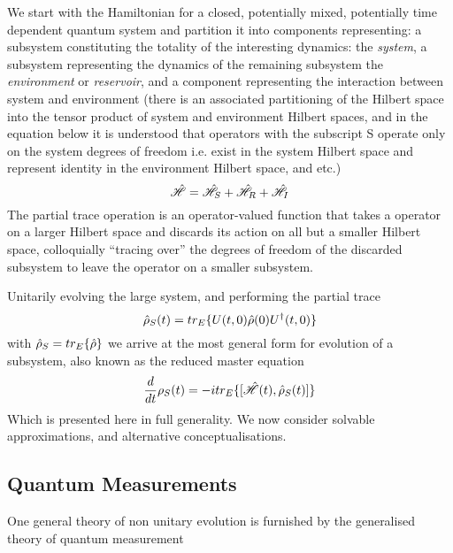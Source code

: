 We start with the Hamiltonian for a closed, potentially mixed, potentially time dependent quantum system and partition it into components representing: a subsystem constituting the totality of the interesting dynamics: the \emph{system}, a subsystem representing the dynamics of the remaining subsystem the \emph{environment} or \emph{reservoir}, and a component representing the interaction between system and environment (there is an associated partitioning of the Hilbert space into the tensor product of system and environment Hilbert spaces, and in the equation below it is understood that operators with the subscript S operate only on the system degrees of freedom i.e. exist in the system Hilbert space and represent identity in the environment Hilbert space, and etc.)
\begin{equation}
	\hat{\mathscr{H}} = \hat{\mathscr{H}}_S +\hat{\mathscr{H}}_R + \hat{\mathscr{H}}_I
\end{equation}
The partial trace operation is an operator-valued function that takes a operator on a larger Hilbert space and discards its action on all but a smaller Hilbert space, colloquially ``tracing over'' the degrees of freedom of the discarded subsystem to leave the operator on a smaller subsystem.

Unitarily evolving the large system, and performing the partial trace
\begin{equation}
	\hat{\rho}_S (t) = tr_E \{U(t, 0) \hat{\rho} (0) U^\dagger (t, 0) \}
\end{equation}
with $\hat{\rho}_S = tr_E\{\hat{\rho} \}$ we arrive at the most general form for evolution of a subsystem, also known as the reduced master equation
\begin{equation}
	\frac{d}{dt} \rho_S (t) = -itr_E\{[\hat{\mathscr{H}}(t), \hat{\rho}_S(t)]\}
\end{equation}
Which is presented here in full generality. We now consider solvable approximations, and alternative conceptualisations.
\subsection{Quantum Measurements}
One general theory of non unitary evolution is furnished by the generalised theory of quantum measurement \cite{Wiseman2010a}
